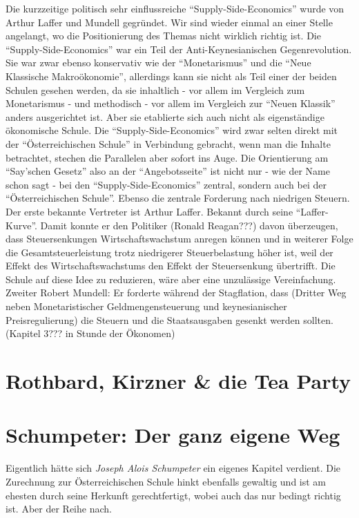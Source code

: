 Die kurzzeitige politisch sehr einflussreiche "`Supply-Side-Economics"' wurde von Arthur Laffer und Mundell gegründet. Wir sind wieder einmal an einer Stelle angelangt, wo die Positionierung des Themas nicht wirklich richtig ist. Die "`Supply-Side-Economics"' war ein Teil der Anti-Keynesianischen Gegenrevolution. Sie war zwar ebenso konservativ wie der "`Monetarismus"' und die "`Neue Klassische Makroökonomie"', allerdings kann sie nicht als Teil einer der beiden Schulen gesehen werden, da sie inhaltlich - vor allem im Vergleich zum Monetarismus - und methodisch - vor allem im Vergleich zur "`Neuen Klassik"' anders ausgerichtet ist. Aber sie etablierte sich auch nicht als eigenständige ökonomische Schule.
Die "`Supply-Side-Economics"' wird zwar selten direkt mit der "`Österreichischen Schule"' in Verbindung gebracht, wenn man die Inhalte betrachtet, stechen die Parallelen aber sofort ins Auge. Die Orientierung am "`Say'schen Gesetz"' also an der "`Angebotsseite"' ist nicht nur - wie der Name schon sagt - bei den "`Supply-Side-Economics"' zentral, sondern auch bei der "`Österreichischen Schule"'. Ebenso die zentrale Forderung nach niedrigen Steuern.
Der erste bekannte Vertreter ist Arthur Laffer. Bekannt durch seine "`Laffer-Kurve"'. Damit konnte er den Politiker (Ronald Reagan???) davon überzeugen, dass Steuersenkungen Wirtschaftswachstum anregen können und in weiterer Folge die Gesamtsteuerleistung trotz niedrigerer Steuerbelastung höher ist, weil der Effekt des Wirtschaftswachstums den Effekt der Steuersenkung übertrifft. Die Schule auf diese Idee zu reduzieren, wäre aber eine unzulässige Vereinfachung.
Zweiter Robert Mundell: Er forderte während der Stagflation, dass (Dritter Weg neben Monetaristischer Geldmengensteuerung und keynesianischer Preisregulierung) die Steuern und die Staatsausgaben gesenkt werden sollten. (Kapitel 3??? in Stunde der Ökonomen)

\section{Rothbard, Kirzner \& die Tea Party}

\section{Schumpeter: Der ganz eigene Weg}
Eigentlich hätte sich \textit{Joseph Alois Schumpeter} ein eigenes Kapitel verdient. Die Zurechnung zur Österreichischen Schule hinkt ebenfalls gewaltig und ist am ehesten durch seine Herkunft gerechtfertigt, wobei auch das nur bedingt richtig ist. Aber der Reihe nach.


